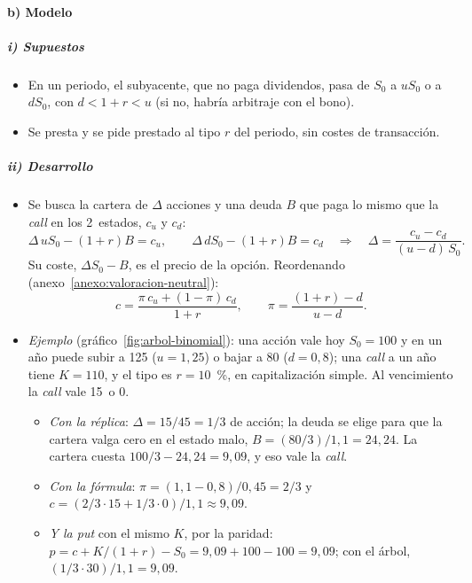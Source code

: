 \documentclass[11pt]{article}
\begin{document}
\paragraph{b) Modelo}

\subparagraph{i) Supuestos}

\begin{itemize}
\item En un periodo, el subyacente, que no paga dividendos, pasa de $S_0$ a $uS_0$ o a $dS_0$, con $d<1+r<u$ (si no, habría arbitraje con el bono).
\item Se presta y se pide prestado al tipo $r$ del periodo, sin costes de transacción.
\end{itemize}

\subparagraph{ii) Desarrollo}

\begin{itemize}
\item Se busca la cartera de $\Delta$ acciones y una deuda $B$ que paga lo mismo que la \emph{call} en los 2~estados, $c_u$ y $c_d$:
  \begin{equation}\label{eq:replica}
  \Delta\,uS_0-(1+r)B=c_u,\qquad \Delta\,dS_0-(1+r)B=c_d\quad\Longrightarrow\quad \Delta=\frac{c_u-c_d}{(u-d)\,S_0}.
  \end{equation}
  Su coste, $\Delta S_0-B$, es el precio de la opción. Reordenando (anexo~\ref{anexo:valoracion-neutral}):
  \begin{equation}\label{eq:binomial}
  c=\frac{\pi\,c_u+(1-\pi)\,c_d}{1+r},\qquad \pi=\frac{(1+r)-d}{u-d}.
  \end{equation}
\item \emph{Ejemplo} (gráfico~\ref{fig:arbol-binomial}): una acción vale hoy $S_0=100$ y en un año puede subir a 125 ($u=1{,}25$) o bajar a 80 ($d=0{,}8$); una \emph{call} a un año tiene $K=110$, y el tipo es $r=10$~\%, en capitalización simple. Al vencimiento la \emph{call} vale 15~o 0.
  \begin{itemize}
  \item \emph{Con la réplica}: $\Delta=15/45=1/3$ de acción; la deuda se elige para que la cartera valga cero en el estado malo, $B=(80/3)/1{,}1=24{,}24$. La cartera cuesta $100/3-24{,}24=9{,}09$, y eso vale la \emph{call}.
  \item \emph{Con la fórmula}: $\pi=(1{,}1-0{,}8)/0{,}45=2/3$ y $c=(2/3\cdot15+1/3\cdot0)/1{,}1\approx9{,}09$.
  \item \emph{Y la \emph{put}} con el mismo $K$, por la paridad: $p=c+K/(1+r)-S_0=9{,}09+100-100=9{,}09$; con el árbol, $(1/3\cdot30)/1{,}1=9{,}09$.
  \end{itemize}
\end{itemize}
\end{document}
